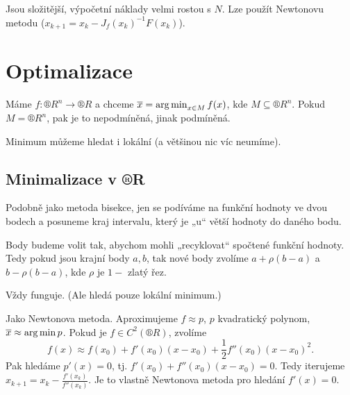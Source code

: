 \documentclass[12pt]{article}					%
\begin{document}
	\begin{poznamka}
		Jsou složitější, výpočetní náklady velmi rostou s $N$. Lze použít Newtonovu metodu ($x_{k+1} = x_k - J_f(x_k)^{-1} F(x_k)$).
	\end{poznamka}


\section{Optimalizace}	
\begin{definice}
	Máme $f: ®R^n \rightarrow ®R$ a chceme $\overline{x} = \operatorname{arg\,min}_{x \in M} f(x)$, kde $M \subseteq ®R^n$. Pokud $M = ®R^n$, pak je to nepodmíněná, jinak podmíněná.

	Minimum můžeme hledat i lokální (a většinou nic víc neumíme).
\end{definice}

	\subsection{Minimalizace v ®R}
	\begin{definice}
		Podobně jako metoda bisekce, jen se podíváme na funkční hodnoty ve dvou bodech a posuneme kraj intervalu, který je „u“ větší hodnoty do daného bodu.

		Body budeme volit tak, abychom mohli „recyklovat“ spočtené funkční hodnoty. Tedy pokud jsou krajní body $a, b$, tak nové body zvolíme $a + \rho(b - a)$ a $b - \rho(b - a)$, kde $\rho$ je $1 -$ zlatý řez.

		\begin{poznamkain}
			Vždy funguje. (Ale hledá pouze lokální minimum.)
		\end{poznamkain}
	\end{definice}

	\begin{definice}
		Jako Newtonova metoda. Aproximujeme $f \approx p$, $p$ kvadratický polynom, $\overline{x} \approx \operatorname{arg\,min} p$. Pokud je $f \in C^2(®R)$, zvolíme
		$$ f(x) \approx f(x_0) + f'(x_0)(x - x_0) + \frac{1}{2}f''(x_0)(x - x_0)^2. $$
		Pak hledáme $p'(x) = 0$, tj. $f'(x_0) + f''(x_0)(x - x_0) = 0$. Tedy iterujeme $x_{k+1} = x_k - \frac{f'(x_k)}{f''(x_k)}$. Je to vlastně Newtonova metoda pro hledání $f'(x) = 0$.
	\end{definice}
\end{document}
